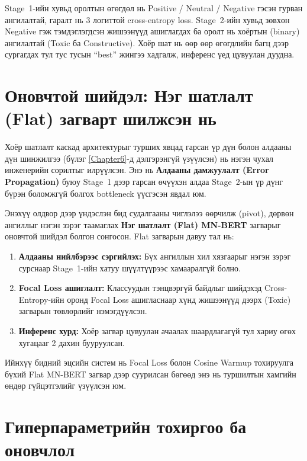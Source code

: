 Stage~1-ийн хувьд оролтын өгөгдөл нь Positive / Neutral / Negative гэсэн гурван
ангилалтай, гаралт нь 3 логиттой cross-entropy loss. Stage~2-ийн хувьд зөвхөн
Negative гэж тэмдэглэгдсэн жишээнүүд ашиглагдах ба оролт нь хоёртын (binary)
ангилалтай (Toxic ба Constructive). Хоёр шат нь өөр өөр өгөгдлийн багц дээр
сургагдах тул тус тусын ``best'' жингээ хадгалж, инференс үед цувуулан дуудна.

\section{Оновчтой шийдэл: Нэг шатлалт (Flat) загварт шилжсэн нь}

Хоёр шатлалт каскад архитектурыг турших явцад гарсан үр дүн болон алдааны
дүн шинжилгээ (бүлэг \ref{Chapter6}-д дэлгэрэнгүй үзүүлсэн) нь нэгэн чухал
инженерийн сорилтыг илрүүлсэн. Энэ нь \textbf{Алдааны дамжуулалт (Error
Propagation)} буюу Stage~1 дээр гарсан өчүүхэн алдаа Stage~2-ын үр дүнг
бүрэн боломжгүй болгох bottleneck үүсгэсэн явдал юм.

Энэхүү олдвор дээр үндэслэн бид судалгааны чиглэлээ өөрчилж (pivot), дөрвөн
ангиллыг нэгэн зэрэг таамаглах \textbf{Нэг шатлалт (Flat) MN-BERT} загварыг
оновчтой шийдэл болгон сонгосон. Flat загварын давуу тал нь:

\begin{enumerate}
    \item \textbf{Алдааны нийлбэрээс сэргийлэх:} Бүх ангиллын хил хязгаарыг
    нэгэн зэрэг сурснаар Stage~1-ийн хатуу шүүлтүүрээс хамааралгүй болно.
    \item \textbf{Focal Loss ашиглалт:} Классуудын тэнцвэргүй байдлыг шийдэхэд
    Cross-Entropy-ийн оронд Focal Loss ашигласнаар хүнд жишээнүүд дээрх (Toxic)
    загварын төвлөрлийг нэмэгдүүлсэн.
    \item \textbf{Инференс хурд:} Хоёр загвар цувуулан ачаалах шаардлагагүй тул
    хариу өгөх хугацааг 2 дахин бууруулсан.
\end{enumerate}

Ийнхүү бидний эцсийн систем нь Focal Loss болон Cosine Warmup тохируулга бүхий
Flat MN-BERT загвар дээр суурилсан бөгөөд энэ нь туршилтын хамгийн өндөр
гүйцэтгэлийг үзүүлсэн юм.

\section{Гиперпараметрийн тохиргоо ба оновчлол}

